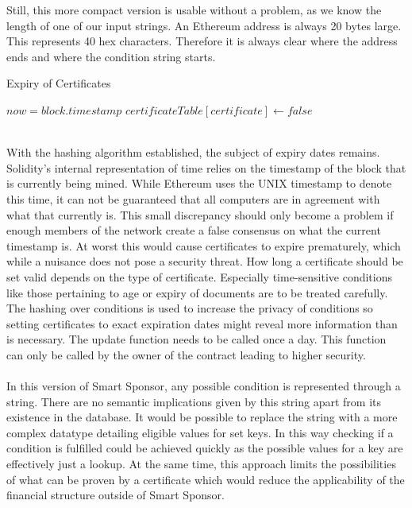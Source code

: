 Still, this more compact version is usable without a problem, as we know the length of one of our input strings. An Ethereum address is always 20 bytes large. This represents 40 hex characters. Therefore it is always clear where the address ends and where the condition string starts.\\
\begin{algorithm}
\caption{Expiry of Certificates}\label{alg:update}
\begin{algorithmic}
\State $now = block.timestamp$
\State $certificateTable[certificate] \gets false$
\EndIf
\EndFor
\end{algorithmic}
\end{algorithm}
\\
With the hashing algorithm established, the subject of expiry dates remains. Solidity's internal representation of time relies on the timestamp of the block that is currently being mined. While Ethereum uses the UNIX timestamp to denote this time, it can not be guaranteed that all computers are in agreement with what that currently is. This small discrepancy should only become a problem if enough members of the network create a false consensus on what the current timestamp is. At worst this would cause certificates to expire prematurely, which while a nuisance does not pose a security threat. How long a certificate should be set valid depends on the type of certificate. Especially time-sensitive conditions like those pertaining to age or expiry of documents are to be treated carefully. The hashing over conditions is used to increase the privacy of conditions so setting certificates to exact expiration dates might reveal more information than is necessary. The update function needs to be called once a day. This function can only be called by the owner of the contract leading to higher security.\\
\\
In this version of Smart Sponsor, any possible condition is represented through a string. There are no semantic implications given by this string apart from its existence in the database. It would be possible to replace the string with a more complex datatype detailing eligible values for set keys. In this way checking if a condition is fulfilled could be achieved quickly as the possible values for a key are effectively just a lookup. At the same time, this approach limits the possibilities of what can be proven by a certificate which would reduce the applicability of the financial structure outside of Smart Sponsor.\\ 
